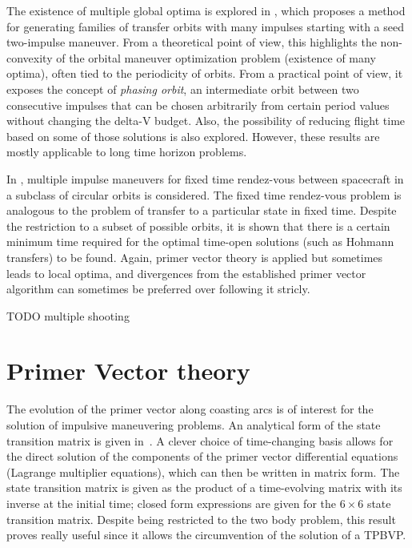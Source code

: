 The existence of multiple global optima is explored in , which proposes a method for generating families of transfer orbits with many impulses starting with a seed two-impulse maneuver. From a theoretical point of view, this highlights the non-convexity of the orbital maneuver optimization problem (existence of many optima), often tied to the periodicity of orbits. From a practical point of view, it exposes the concept of \textit{phasing orbit}, an intermediate orbit between two consecutive impulses that can be chosen arbitrarily from certain period values without changing the delta-V budget. Also, the possibility of reducing flight time based on some of those solutions is also explored. However, these results are mostly applicable to long time horizon problems.

In , multiple impulse maneuvers for fixed time rendez-vous between spacecraft in a subclass of circular orbits is considered. The fixed time rendez-vous problem is analogous to the problem of transfer to a particular state in fixed time. Despite the restriction to a subset of possible orbits, it is shown that there is a certain minimum time required for the optimal time-open solutions (such as Hohmann transfers) to be found. Again, primer vector theory is applied but sometimes leads to local optima, and divergences from the established primer vector algorithm can sometimes be preferred over following it stricly.

TODO multiple shooting



\section{Primer Vector theory}

The evolution of the primer vector along coasting arcs is of interest for the solution of impulsive maneuvering problems. An analytical form of the state transition matrix is given in~. A clever choice of time-changing basis allows for the direct solution of the components of the primer vector differential equations (Lagrange multiplier equations), which can then be written in matrix form. The state transition matrix is given as the product of a time-evolving matrix with its inverse at the initial time; closed form expressions are given for the \(6\times6\) state transition matrix. Despite being restricted to the two body problem, this result proves really useful since it allows the circumvention of the solution of a TPBVP.

